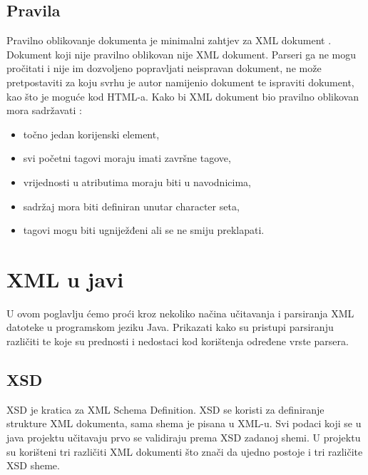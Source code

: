 \documentclass{foi}
\begin{document}
\section{Pravila}
Pravilno oblikovanje dokumenta je minimalni zahtjev za XML dokument \cite{w3c_rec}.
Dokument koji nije pravilno oblikovan nije XML dokument. Parseri ga ne mogu pročitati i
nije im dozvoljeno popravljati neispravan dokument, ne može pretpostaviti za koju
svrhu je autor namijenio dokument te ispraviti dokument, kao što je moguće kod HTML-a.
Kako bi XML dokument bio pravilno oblikovan mora sadržavati \cite{process_xml}:
\begin{itemize}
	\item točno jedan korijenski element,
	\item svi početni tagovi moraju imati završne tagove,
	\item vrijednosti u atributima moraju biti u navodnicima,
	\item sadržaj mora biti definiran unutar character seta,
	\item tagovi mogu biti ugniježđeni ali se ne smiju preklapati.
\end{itemize}

\chapter{XML u javi}
U ovom poglavlju ćemo proći kroz nekoliko načina učitavanja i parsiranja XML datoteke
u programskom jeziku Java. Prikazati kako su pristupi parsiranju različiti te koje su
prednosti i nedostaci kod korištenja određene vrste parsera.

\section{XSD}
XSD je kratica za XML Schema Definition. XSD se koristi za definiranje strukture XML
dokumenta, sama shema je pisana u XML-u.
Svi podaci koji se u java projektu učitavaju prvo se validiraju prema XSD zadanoj shemi.
U projektu su korišteni tri različiti XML dokumenti što znači da ujedno postoje i
tri različite XSD sheme.
\end{document}
